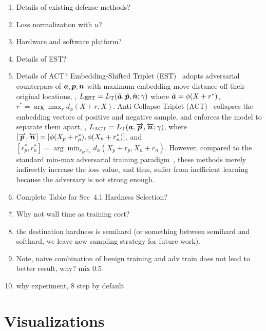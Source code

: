 \begin{enumerate}[noitemsep]
	\item Details of existing defense methods?

	\item Loss normalization with $u$?

	\item Hardware and software platform?

	\item Details of EST?

	\item Details of ACT?
%
Embedding-Shifted Triplet (EST)~\cite{advrank} adopts adversarial counterpars
of ${\bm{a}},{\bm{p}},{\bm{n}}$ with maximum embedding move distance off their original
locations, \ie,
$L_\text{EST}=L_\text{T}(\tilde{{\bm{a}}},\tilde{{\bm{p}}},\tilde{{\bm{n}}};\gamma)$ where
$\tilde{{\bm{a}}}=\phi(X+r^*)$, $r^*=\arg\max_{r}d_\phi(X+r, X)$.
%
Anti-Collapse Triplet (ACT)~\cite{robrank} collapses the embedding vectors of
positive and negative sample, and enforces the model to separate them apart,
\ie, $L_\text{ACT}=L_\text{T}({\bm{a}}, \overrightarrow{{\bm{p}}},
\overleftarrow{{\bm{n}}};\gamma)$, where $[\overrightarrow{{\bm{p}}},\overleftarrow{{\bm{n}}}]
=[\phi(X_p+r_p^*), \phi(X_n+r_n^*)]$, and $[r_p^*,r_n^*]=\arg\min_{r_p,r_n}
d_\phi(X_p+r_p, X_n+r_n)$.
%
However, compared to the standard min-max adversarial training
paradigm~\cite{madry}, these methods merely indirectly increase the loss value,
and thus, suffer from inefficient learning because the adversary is not strong
enough.

	\item Complete Table for Sec~4.1 Hardness Selection?

	\item Why not wall time as training cost?

	\item the destination hardness is semihard (or something between semihard
		and softhard, we leave new sampling strategy for future work).

	\item Note, naive combination of benign training and adv train does not lead to better
result, why? mix 0.5

	\item why experiment, 8 step by default

\end{enumerate}



\section{Visualizations}

